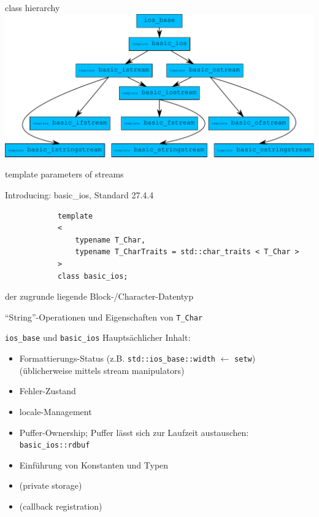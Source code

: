 \begin{frame}{class hierarchy}
	\includegraphics[width=\textwidth]{images/streams-class-hierarchy}
\end{frame}

\begin{frame}[fragile]{template parameters of streams}
	\begin{block}{Introducing: basic\_ios, Standard 27.4.4}
		\begin{lstlisting}
			template
			<
			    typename T_Char,
			    typename T_CharTraits = std::char_traits < T_Char >
			>
			class basic_ios;
		\end{lstlisting}
		
		\vspace{1em}
		
		\begin{description}[leftmargin=5em]
			\item[\texttt{T\_Char}] der zugrunde liegende Block-/Character-Datentyp
			\item[\texttt{T\_CharTraits}] \enquote{String}-Operationen und Eigenschaften von \texttt{T\_Char}
		\end{description}
	\end{block}
\end{frame}

\begin{frame}{\texttt{ios\_base} und \texttt{basic\_ios}}
	Hauptsächlicher Inhalt:
	\begin{itemize}
		\item Formattierungs-Status (z.B. \texttt{std::ios\_base::width} $\leftarrow$ \texttt{setw})	\\
			(üblicherweise mittels stream manipulators)
		\item Fehler-Zustand
		\item locale-Management
		\item Puffer-Ownership; Puffer lässt sich zur Laufzeit austauschen: \texttt{basic\_ios::rdbuf}
		\item Einführung von Konstanten und Typen
		\item \footnotesize (private storage)
		\item \footnotesize (callback registration)
	\end{itemize}
\end{frame}

